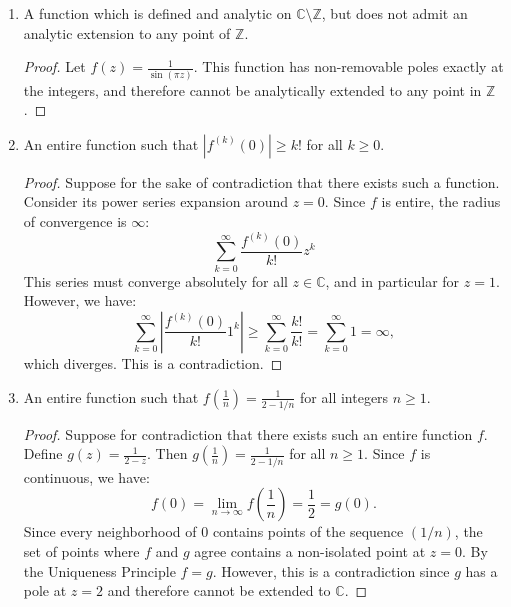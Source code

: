 \documentclass[a4paper,11pt]{article}
\newcommand{\Z}{\mathbb{Z}}
\newcommand{\C}{\mathbb{C}}
\begin{document}
\begin{enumerate}[label=\textbf{(\alph*)}]
    \item A function which is defined and analytic on $\C\setminus\Z$, but does not admit an analytic extension to any point of $\Z$.
    \begin{proof}
        Let $f(z) = \frac{1}{\sin(\pi z)}$. This function has non-removable poles exactly at the integers, and therefore cannot be analytically extended to any point in $\Z$.
    \end{proof}
    
    \item An entire function such that $|f^{(k)}(0)|\ge k!$ for all $k\ge0$.
    \begin{proof}
        Suppose for the sake of contradiction that there exists such a function. Consider its power series expansion around $z=0$. Since $f$ is entire, the radius of convergence is $\infty$:
        \[\sum_{k=0}^{\infty} \frac{f^{(k)}(0)}{k!}z^k\]
        This series must converge absolutely for all $z\in\C$, and in particular for $z=1$. However, we have:
        \[
        \sum_{k=0}^{\infty} \left|\frac{f^{(k)}(0)}{k!}1^k\right| 
        \geq \sum_{k=0}^{\infty} \frac{k!}{k!} 
        = \sum_{k=0}^{\infty} 1 = \infty,
        \]
        which diverges. This is a contradiction.
    \end{proof}
    
    \item An entire function such that $f\left(\frac{1}{n}\right)=\frac{1}{2-1/n}$ for all integers $n\ge1$.
        \begin{proof}
        Suppose for contradiction that there exists such an entire function $f$.
        Define $g(z) = \frac{1}{2-z}$. Then $g\left(\frac{1}{n}\right) = \frac{1}{2-1/n}$ for all $n\geq1$.
        Since $f$ is continuous, we have: 
        \[ f(0) = \lim_{n\to\infty} f\left(\frac{1}{n}\right) = \frac{1}{2} = g(0). \]
        Since every neighborhood of $0$ contains points of the sequence $(1/n)$, the set of points where $f$ and $g$ agree contains a non-isolated point at $z=0$.
        By the Uniqueness Principle $f=g$. 
        However, this is a contradiction since $g$ has a pole at $z=2$ and therefore cannot be extended to $\C$.
    \end{proof}
\end{enumerate}
\end{document}
